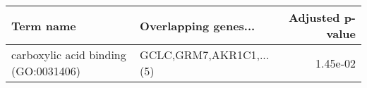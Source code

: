 \begin{tabular}{llr}
\toprule
                           Term name &    Overlapping genes... &  Adjusted p-value \\
\midrule
carboxylic acid binding (GO:0031406) & GCLC,GRM7,AKR1C1,...(5) &          1.45e-02 \\
\bottomrule
\end{tabular}
